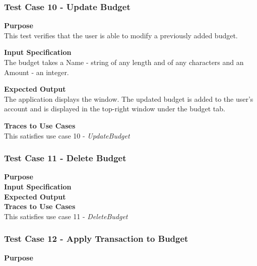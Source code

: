 \documentclass[12pt]{article}
\begin{document}
\subsubsection{Test Case 10 - Update Budget} \label{TC-10}

{\bf Purpose}\\
This test verifies that the user is able to modify a previously added budget.                  

{\bf Input Specification}\\
The budget takes a Name - string of any length and of any characters
and an Amount - an integer.

\noindent
{\bf Expected Output}\\
The application displays the window.
The updated budget is added to the user's account and is displayed in the top-right window
under the budget tab.

\noindent
{\bf Traces to Use Cases}\\
This satisfies use case 10 - \textit{UpdateBudget}
\clearpage %


\subsubsection{Test Case 11 - Delete Budget} \label{TC-11}
\noindent
{\bf Purpose}\\
                                        
\noindent
{\bf Input Specification}\\

\noindent
{\bf Expected Output}\\

\noindent
{\bf Traces to Use Cases}\\
This satisfies use case 11 - \textit{DeleteBudget}


\subsubsection{Test Case 12 - Apply Transaction to Budget} \label{TC-12}
\noindent
{\bf Purpose}\\
                                                        
\end{document}
